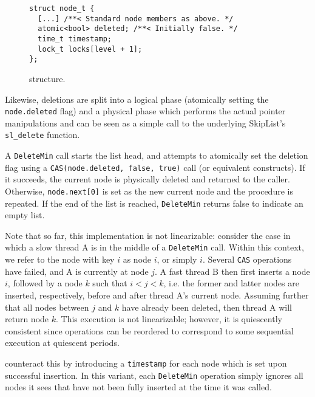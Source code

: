 \documentclass[a4paper,10pt]{article}
\begin{document}
\begin{figure}[ht]
\begin{lstlisting}
struct node_t {
  [...] /**< Standard node members as above. */
  atomic<bool> deleted; /**< Initially false. */
  time_t timestamp;
  lock_t locks[level + 1];
};
\end{lstlisting}
\caption{\citeauthor{shavit2000skiplist} structure.}
\label{fig:shavitsl}
\end{figure}

Likewise, deletions are split into a logical phase (atomically setting the \lstinline|node.deleted|
flag) and a physical phase which performs the actual pointer manipulations and can be seen as a simple
call to the underlying SkipList's \lstinline|sl_delete| function.

A \lstinline|DeleteMin| call starts the list head, and attempts to atomically set
the deletion flag using a \lstinline|CAS(node.deleted, false, true)| call (or equivalent constructs).
If it succeeds, the current node is physically deleted and returned to the caller. Otherwise,
\lstinline|node.next[0]| is set as the new current node and the procedure is repeated.
If the end of the list is reached, \lstinline|DeleteMin| returns false to indicate an empty list.


Note that so far, this implementation is not linearizable: consider the case in which a
slow thread A is in the middle of a \lstinline|DeleteMin| call. Within this context, we refer to 
the node with key $i$ as node $i$, or simply $i$. Several \lstinline|CAS|
operations have failed, and A is currently at node $j$.
A fast thread B then first inserts a node $i$, followed by a node $k$ such that
$i < j < k$, i.e. the former and latter nodes are inserted, respectively, before and after
thread A's current node. Assuming further that all nodes between $j$ and $k$ have already
been deleted, then thread A will return node $k$. This execution is not linearizable; however,
it is quiescently consistent since operations can be reordered to correspond to some sequential
execution at quiescent periods.

\citeauthor{shavit2000skiplist} counteract this by introducing a \lstinline|timestamp| for each
node which is set upon successful insertion. In this variant, each \lstinline|DeleteMin| operation
simply ignores all nodes it sees that have not been fully inserted at the time it was called.
\end{document}
